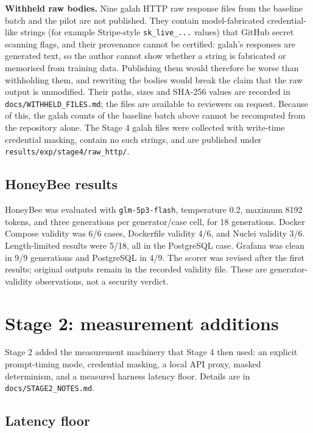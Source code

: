 \documentclass[a4paper,11pt]{article}
\begin{document}
\textbf{Withheld raw bodies.} Nine galah HTTP raw response files from the
baseline batch and the pilot are not published. They contain
model-fabricated credential-like strings (for example Stripe-style
\texttt{sk\_live\_...} values) that GitHub secret scanning flags, and their
provenance cannot be certified: galah's responses are generated text, so the
author cannot show whether a string is fabricated or memorised from training
data. Publishing them would therefore be worse than withholding them, and
rewriting the bodies would break the claim that the raw output is unmodified.
Their paths, sizes and SHA-256 values are recorded in
\texttt{docs/WITHHELD\_FILES.md}; the files are available to reviewers on
request. Because of this, the galah counts of the baseline batch above cannot
be recomputed from the repository alone. The Stage 4 galah files were
collected with write-time credential masking, contain no such strings, and are
published under \texttt{results/exp/stage4/raw\_http/}.

\subsection{HoneyBee results}

HoneyBee was evaluated with \texttt{glm-5p3-flash}, temperature 0.2, maximum
8192 tokens, and three generations per generator/case cell, for 18
generations. Docker Compose validity was 6/6 cases, Dockerfile validity 4/6,
and Nuclei validity 3/6. Length-limited results were 5/18, all in the
PostgreSQL case. Grafana was clean in 9/9 generations and PostgreSQL in 4/9.
The scorer was revised after the first results; original outputs remain in the
recorded validity file. These are generator-validity observations, not a
security verdict.

\section{Stage 2: measurement additions}

Stage 2 added the measurement machinery that Stage 4 then used: an explicit
prompt-timing mode, credential masking, a local API proxy, masked determinism,
and a measured harness latency floor. Details are in
\texttt{docs/STAGE2\_NOTES.md}.

\subsection{Latency floor}
\label{sec:floor}
\end{document}
